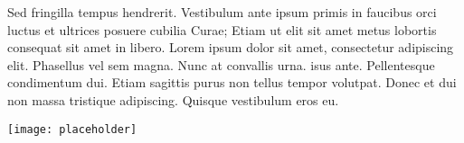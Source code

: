 \documentclass[landscape,a0paper,fontscale=0.285]{baposter} %
\newcommand{\compresslist}{ %
\setlength{\itemsep}{1pt}
\setlength{\parskip}{0pt}
\setlength{\parsep}{0pt}
}
\begin{document}
\begin{poster}
{%

\begin{multicols}{2}
\vspace{1em}
Sed fringilla tempus hendrerit. Vestibulum ante ipsum primis in faucibus orci luctus et ultrices posuere cubilia Curae; Etiam ut elit sit amet metus lobortis consequat sit amet in libero. Lorem ipsum dolor sit amet, consectetur adipiscing elit. Phasellus vel sem magna. Nunc at convallis urna. isus ante. Pellentesque condimentum dui. Etiam sagittis purus non tellus tempor volutpat. Donec et dui non massa tristique adipiscing. Quisque vestibulum eros eu.

\begin{center}
\texttt{[image: placeholder]}
\end{center}

\end{multicols}

}










\end{poster}
\end{document}
